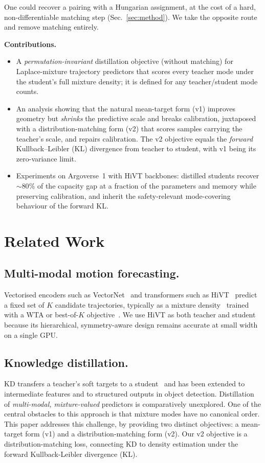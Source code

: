 \documentclass[conference]{IEEEtran}
\begin{document}
One could recover a pairing with a Hungarian assignment, at the cost of a hard,
non-differentiable matching step (Sec.~\ref{sec:method}). We take the opposite route
and remove matching entirely.

\noindent\textbf{Contributions.}
\begin{itemize}
\item A \emph{permutation-invariant} distillation objective (without matching) for
Laplace-mixture trajectory predictors that scores every teacher mode under the
student's full mixture density; it is defined for any
teacher/student mode counts.
\item An analysis showing that the natural mean-target form (v1) improves geometry
but \emph{shrinks} the predictive scale and breaks calibration, juxtaposed with a
distribution-matching form (v2) that scores samples carrying the teacher's scale,
and repairs calibration. The v2 objective equals the \emph{forward} Kullback–Leibler 
(KL) divergence from teacher to student, with v1 being its zero-variance limit.
\item Experiments on Argoverse~1 with HiVT backbones: distilled students recover
$\sim 80\%$ of the capacity gap at a fraction of the parameters and memory while
preserving calibration, and inherit the safety-relevant mode-covering behaviour of
the forward KL.
\end{itemize}

\section{Related Work}
\subsection{Multi-modal motion forecasting.} Vectorised encoders such as
VectorNet~\cite{vectornet} and transformers such as
HiVT~\cite{hivt} predict a fixed set of $K$ candidate trajectories, typically as a
mixture density~\cite{bishop1994} trained with a WTA or best-of-$K$
objective~\cite{mtp2019,multipath}. We use HiVT as both teacher and student because
its hierarchical, symmetry-aware design remains accurate at small width on a single
GPU.

\subsection{Knowledge distillation.} KD transfers a teacher's soft
targets to a student~\cite{hinton2015} and has been extended to intermediate
features and to structured outputs in object detection. Distillation of
\emph{multi-modal, mixture-valued} predictors is comparatively unexplored. One of
the central obstacles to this approach is that mixture modes have no canonical order.
This paper addresses this challenge, by providing two distinct objectives: 
a mean-target form (v1) and a distribution-matching form (v2). 
Our v2 objective is a distribution-matching loss, 
connecting KD to 
density estimation under the forward Kullback-Leibler divergence (KL).
\end{document}
